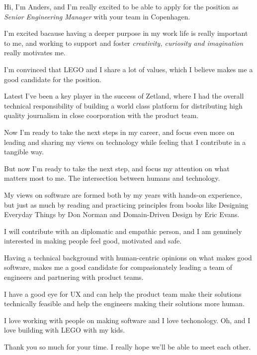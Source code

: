 \documentclass[11pt,a4paper,sans]{moderncv}        %
\begin{document}
\date{\today}
\opening{
  Hi, I'm Anders, and I'm really excited to be able to apply for the position as \textit{Senior Engineering Manager} with your team in Copenhagen.
}
\makelettertitle

I'm excited bacause having a deeper purpose in my work life is really important to me, and working to support and foster \textit{creativity, curiosity and imagination} really motivates me.

I'm convinced that LEGO and I share a lot of values, which I believe makes me a good candidate for the position.

Latest I've been a key player in the success of Zetland, where I had the overall technical responsibility of building a world class platform for distributing high quality journalism in close coorporation with the product team.

Now I'm ready to take the next steps in my career, and focus even more on leading and sharing my views on technology while feeling that I contribute in a tangible way.

But now I'm ready to take the next step, and focus my attention on what matters most to me. The intersection between humans and technology.

My views on software are formed both by my years with hands-on experience, but just as much by reading and practicing principles from books like Designing Everyday Things by Don Norman and Domain-Driven Design by Eric Evans.

I will contribute with an diplomatic and empathic person, and I am genuinely interested in making people feel good, motivated and safe.


Having a technical background with human-centric opinions on what makes good software, makes me a good candidate for compasionately leading a team of engineers and partnering with product teams.


I have a good eye for UX and can help the product team make their solutions technically feasible and help the engineers making their solutions more human.

I love working with people on making software and I love techonology. Oh, and I love building with LEGO with my kids.


\vspace{0.5cm}

\closing{Thank you so much for your time. I really hope we'll be able to meet each other.}
\makeletterclosing
\end{document}

